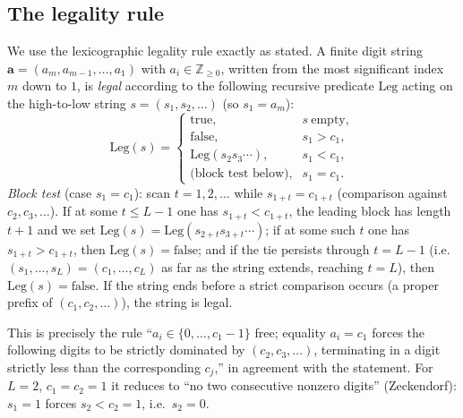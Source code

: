 \documentclass[12pt]{article}
\theoremstyle{definition}
\newcommand{\Z}{\mathbb{Z}}
\begin{document}
\subsection{The legality rule}
We use the lexicographic legality rule exactly as stated. A finite digit string
$\mathbf a=(a_m,a_{m-1},\dots,a_1)$ with $a_i\in\Z_{\ge0}$, written from the
most significant index $m$ down to $1$, is \emph{legal} according to the
following recursive predicate $\mathrm{Leg}$ acting on the high-to-low string
$s=(s_1,s_2,\dots)$ (so $s_1=a_m$):
\begin{equation}\label{eq:legdef}
\mathrm{Leg}(s)=
\begin{cases}
\text{true}, & s\ \text{empty},\\
\text{false}, & s_1>c_1,\\
\mathrm{Leg}(s_2 s_3\cdots), & s_1<c_1,\\
\text{(block test below)}, & s_1=c_1.
\end{cases}
\end{equation}
\emph{Block test} (case $s_1=c_1$): scan $t=1,2,\dots$ while $s_{1+t}=c_{1+t}$
(comparison against $c_2,c_3,\dots$). If at some $t\le L-1$ one has
$s_{1+t}<c_{1+t}$, the leading block has length $t+1$ and we set
$\mathrm{Leg}(s)=\mathrm{Leg}(s_{2+t}s_{3+t}\cdots)$; if at some such $t$ one has
$s_{1+t}>c_{1+t}$, then $\mathrm{Leg}(s)=\text{false}$; and if the tie persists
through $t=L-1$ (i.e.\ $(s_1,\dots,s_L)=(c_1,\dots,c_L)$ as far as the string
extends, reaching $t=L$), then $\mathrm{Leg}(s)=\text{false}$. If the string ends
before a strict comparison occurs (a proper prefix of $(c_1,c_2,\dots)$), the
string is legal.

This is precisely the rule ``$a_i\in\{0,\dots,c_1-1\}$ free; equality
$a_i=c_1$ forces the following digits to be strictly dominated by
$(c_2,c_3,\dots)$, terminating in a digit strictly less than the corresponding
$c_j$,'' in agreement with the statement. For $L=2$, $c_1=c_2=1$ it reduces to
``no two consecutive nonzero digits'' (Zeckendorf): $s_1=1$ forces $s_2<c_2=1$,
i.e.\ $s_2=0$.
\end{document}
